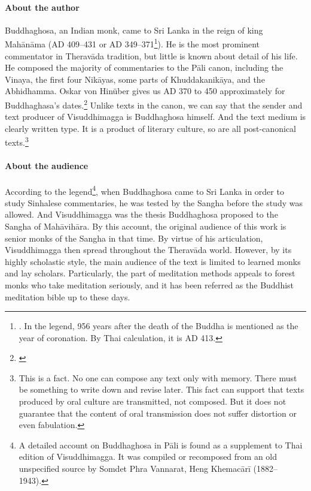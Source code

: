 \paragraph*{About the author} Buddhaghosa, an Indian monk, came to Sri Lanka in the reign of king Mah\=an\=ama (AD 409--431 or AD 349--371\footnote{\citealp[p.~102]{hinuber:literature}. In the legend, 956 years after the death of the Buddha is mentioned as the year of coronation. By Thai calculation, it is AD 413.}). He is the most prominent commentator in Therav\=ada tradition, but little is known about detail of his life. He composed the majority of commentaries to the P\=ali canon, including the Vinaya, the first four Nik\=ayas, some parts of Khuddakanik\=aya, and the Abhidhamma. Oskar von Hin\"uber gives us AD 370 to 450 approximately for Buddhaghasa's dates.\footnote{\citealp[p.~103]{hinuber:literature}} Unlike texts in the canon, we can say that the sender and text producer of Visuddhimagga is Buddhaghosa himself. And the text medium is clearly written type. It is a product of literary culture, so are all post-canonical texts.\footnote{This is a fact. No one can compose any text only with memory. There must be something to write down and revise later. This fact can support that texts produced by oral culture are transmitted, not composed. But it does not guarantee that the content of oral transmission does not suffer distortion or even fabulation.}

\paragraph*{About the audience} According to the legend\footnote{A detailed account on Buddhaghosa in P\=ali is found as a supplement to Thai edition of Visuddhimagga. It was compiled or recomposed from an old unspecified source by Somdet Phra Vannarat, Heng Khemac\=ar\=i (1882--1943).}, when Buddhagh\-osa came to Sri Lanka in order to study Sinhalese commentaries, he was tested by the Sangha before the study was allowed. And Visuddhimagga was the thesis Buddhaghosa proposed to the Sangha of Mah\=avih\=ara. By this account, the original audience of this work is senior monks of the Sangha in that time. By virtue of his articulation, Visuddhimagga then spread throughout the Therav\=ada world. However, by its highly scholastic style, the main audience of the text is limited to learned monks and lay scholars. Particularly, the part of meditation methods appeals to forest monks who take meditation seriously, and it has been referred as the Buddhist meditation bible up to these days.
 
